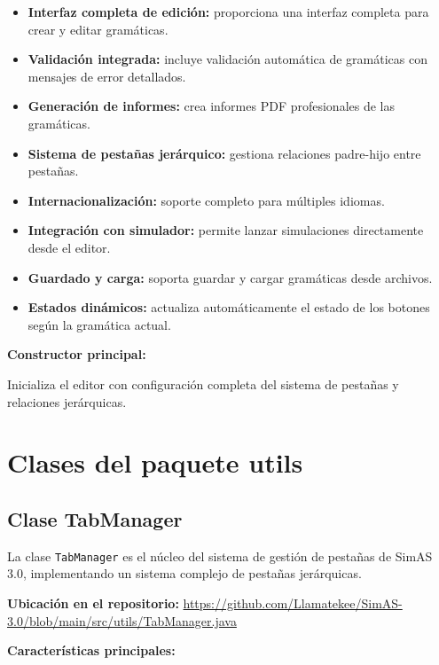 \begin{itemize}
    \item \textbf{Interfaz completa de edición:} proporciona una interfaz completa para crear y editar gramáticas.
    \item \textbf{Validación integrada:} incluye validación automática de gramáticas con mensajes de error detallados.
    \item \textbf{Generación de informes:} crea informes PDF profesionales de las gramáticas.
    \item \textbf{Sistema de pestañas jerárquico:} gestiona relaciones padre-hijo entre pestañas.
    \item \textbf{Internacionalización:} soporte completo para múltiples idiomas.
    \item \textbf{Integración con simulador:} permite lanzar simulaciones directamente desde el editor.
    \item \textbf{Guardado y carga:} soporta guardar y cargar gramáticas desde archivos.
    \item \textbf{Estados dinámicos:} actualiza automáticamente el estado de los botones según la gramática actual.
\end{itemize}

\textbf{Constructor principal:}

Inicializa el editor con configuración completa del sistema de pestañas y relaciones jerárquicas.

\section{Clases del paquete utils}

\subsection{Clase TabManager}

La clase \texttt{TabManager} es el núcleo del sistema de gestión de pestañas de SimAS 3.0, implementando un sistema complejo de pestañas jerárquicas.

\textbf{Ubicación en el repositorio:} \url{https://github.com/Llamatekee/SimAS-3.0/blob/main/src/utils/TabManager.java}

\textbf{Características principales:}

